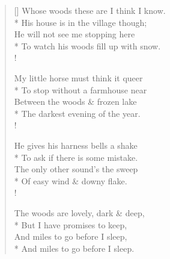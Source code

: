 \documentclass[MAIN]{subfiles}
\begin{document}
\settowidth{\versewidth}{Whose woods these are I think I know.}
\begin{verse}[\versewidth]
Whose woods these are I think I know.\\*
His house is in the village though;\\
He will not see me stopping here\\*
To watch his woods fill up with snow.\\!

My little horse must think it queer\\*
To stop without a farmhouse near\\
Between the woods \& frozen lake\\*
The darkest evening of the year.\\!

He gives his harness bells a shake\\*
To ask if there is some mistake.\\
The only other sound's the sweep\\*
Of easy wind \& downy flake.\\!

The woods are lovely, dark \& deep,\\*
But I have promises to keep,\\
And miles to go before I sleep,\\*
And miles to go before I sleep.
\end{verse}
\end{document}
